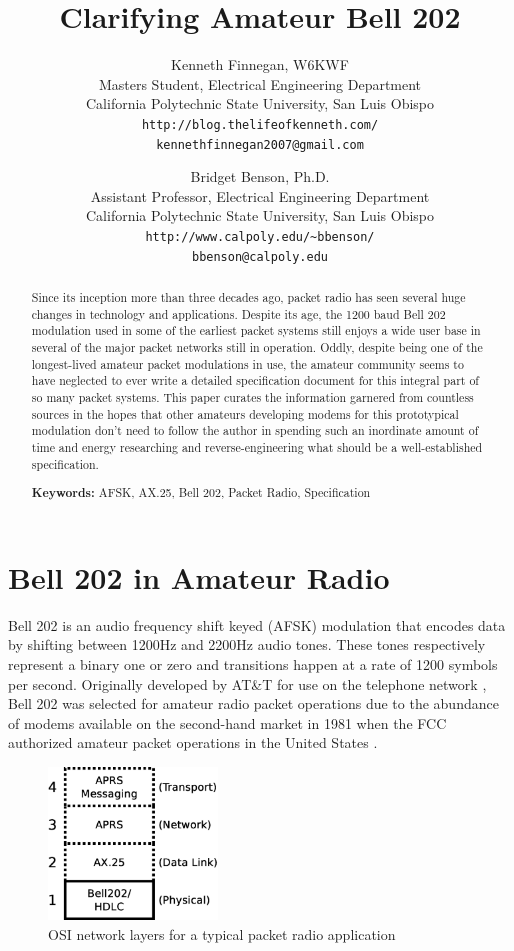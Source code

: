 \documentclass[12pt,letterpaper]{article}
\title{Clarifying Amateur Bell 202}
\author{Kenneth Finnegan, W6KWF\\
\small Masters Student, Electrical Engineering Department\\
\small California Polytechnic State University, San Luis Obispo\\
\small \texttt{http://blog.thelifeofkenneth.com/}\\
\small \texttt{kennethfinnegan2007@gmail.com}\\
\and
Bridget Benson, Ph.D.\\
\small Assistant Professor, Electrical Engineering Department\\
\small California Polytechnic State University, San Luis Obispo\\
\small \texttt{http://www.calpoly.edu/\textasciitilde{}bbenson/}\\
\small \texttt{bbenson@calpoly.edu}}
\begin{document}
\maketitle

\begin{abstract}
	Since its inception more than three decades ago, 
	packet radio has seen several huge changes in technology
	and applications. 
	Despite its age, the 1200 baud Bell 202 modulation used in some
	of the earliest packet systems still enjoys a wide user base
	in several of the major packet networks still in operation.
	Oddly, despite being one of the longest-lived amateur packet modulations in use,
	the amateur community seems to have neglected to ever write a detailed
	specification document for this integral part of so many packet systems.
	This paper curates the information garnered from countless sources
	in the hopes that other amateurs developing modems for 
	this prototypical modulation
	don't need to follow the author in spending such an inordinate amount of
	time and energy researching and reverse-engineering what should be a
	well-established specification.
	
	
	\textbf{Keywords:} AFSK, AX.25, Bell 202, Packet Radio, Specification
\end{abstract}


\section{Bell 202 in Amateur Radio}
\label{sec:bell202history}

Bell 202 is an audio frequency shift keyed (AFSK) modulation that
encodes data by shifting between 1200Hz and 2200Hz audio tones.
These tones respectively represent a binary one or zero and transitions happen
at a rate of 1200 symbols per second.
Originally developed by AT\&T for use on the telephone network \cite{202tspec},
Bell 202 was selected for amateur radio packet operations due to the abundance
of modems available on the second-hand market in 1981 when the FCC authorized
amateur packet operations in the United States \cite{gatewaypacket}.

\begin{figure}
	\centering
	\includegraphics[width=0.4\textwidth]{src/dia/osi_bell202}
	\caption{OSI network layers for a typical packet radio application}
	\label{fig:osibell}
\end{figure}
\end{document}
